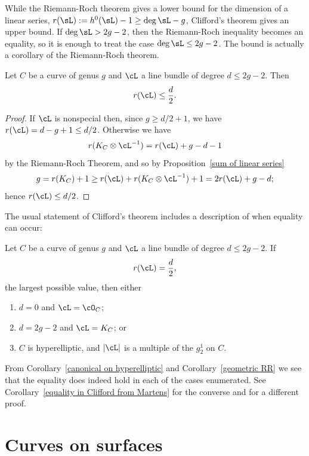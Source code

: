While the Riemann-Roch theorem gives a lower bound for the dimension of a linear series, $r(\sL) := h^0(\sL)-1 \geq \deg \sL -g$, Clifford's theorem
gives an upper bound. If $\deg \sL>2g-2$, then the Riemann-Roch inequality becomes an equality, so it is enough to treat the case $\deg \sL \leq 2g-2$. The bound is actually a corollary of the Riemann-Roch theorem.

\begin{corollary}\label{Clifford bound}
 Let $C$ be a curve of genus $g$ and $\cL$ a line bundle of degree $d \leq 2g-2$. Then
$$
r(\cL) \leq \frac{d}{2}.
$$
\end{corollary}

\begin{proof}
If $\cL$ is nonspecial then, since $g\geq d/2 + 1$, we have $r(\cL) = d-g+1\leq d/2$.
Otherwise we have
$$
r(K_C\otimes \cL^{-1}) = r(\cL) +g - d - 1
$$
by the Riemann-Roch Theorem,
and so by Proposition~\ref{sum of linear series}
$$
g = r(K_C)+1  \geq r(\cL) + r(K_C\otimes \cL^{-1}) +1  = 2r(\cL) +g - d;
$$
hence $r(\cL) \leq d/2$.
\end{proof}

The usual statement of Clifford's theorem includes a description of when equality can occur:

\begin{theorem}\label{Clifford}\label{Clifford equality}
Let $C$ be a curve of genus $g$ and $\cL$ a line bundle of degree $d \leq 2g-2$. If
$$
r(\cL) = \frac{d}{2},
$$
the largest possible value, then either
\begin{enumerate}
\item $d=0$ and $\cL = \cO_C$;
\item $d = 2g-2$ and $\cL = K_C$; or
\item $C$ is hyperelliptic, and $|\cL|$ is a multiple of the $g^1_2$ on $C$.
\end{enumerate}
\end{theorem}

From Corollary~\ref{canonical on hyperelliptic} and Corollary~\ref{geometric RR} we see that the equality does indeed hold
in each of the cases enumerated. See
Corollary~\ref{equality in Clifford from Martens} for the converse and \cite[IV.5.4]{Hartshorne1977}
for a different proof.

 \section{Curves on surfaces}\label{surface basics}
 
